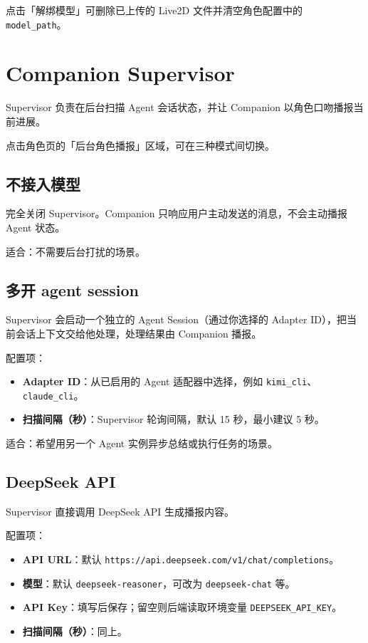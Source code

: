 \documentclass[12pt,a4paper]{article}
\begin{document}
点击「解绑模型」可删除已上传的 Live2D 文件并清空角色配置中的 \texttt{model\_path}。

\section{Companion Supervisor}

Supervisor 负责在后台扫描 Agent 会话状态，并让 Companion 以角色口吻播报当前进展。

点击角色页的「后台角色播报」区域，可在三种模式间切换。

\subsection{不接入模型}

完全关闭 Supervisor。Companion 只响应用户主动发送的消息，不会主动播报 Agent 状态。

适合：不需要后台打扰的场景。

\subsection{多开 agent session}

Supervisor 会启动一个独立的 Agent Session（通过你选择的 Adapter ID），把当前会话上下文交给他处理，处理结果由 Companion 播报。

配置项：

\begin{itemize}
  \item \textbf{Adapter ID}：从已启用的 Agent 适配器中选择，例如 \texttt{kimi\_cli}、\texttt{claude\_cli}。
  \item \textbf{扫描间隔（秒）}：Supervisor 轮询间隔，默认 15 秒，最小建议 5 秒。
\end{itemize}

适合：希望用另一个 Agent 实例异步总结或执行任务的场景。

\subsection{DeepSeek API}

Supervisor 直接调用 DeepSeek API 生成播报内容。

配置项：

\begin{itemize}
  \item \textbf{API URL}：默认 \texttt{https://api.deepseek.com/v1/chat/completions}。
  \item \textbf{模型}：默认 \texttt{deepseek-reasoner}，可改为 \texttt{deepseek-chat} 等。
  \item \textbf{API Key}：填写后保存；留空则后端读取环境变量 \texttt{DEEPSEEK\_API\_KEY}。
  \item \textbf{扫描间隔（秒）}：同上。
\end{itemize}
\end{document}
